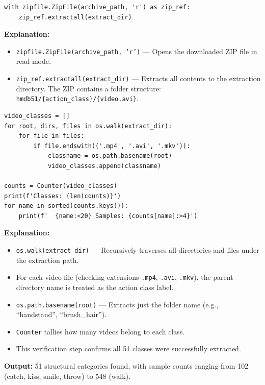 \documentclass[a4paper, 12pt]{article}
\newenvironment{explanation}{%
  \par\smallskip
  \noindent\textcolor{blue!70!black}{\textbf{Explanation:}}\\
  \noindent
}{\par\medskip}
\begin{document}
\begin{lstlisting}
with zipfile.ZipFile(archive_path, 'r') as zip_ref:
    zip_ref.extractall(extract_dir)
\end{lstlisting}

\begin{explanation}
\begin{itemize}[nosep]
  \item \texttt{zipfile.ZipFile(archive\_path, 'r')} --- Opens the downloaded ZIP file in read mode.
  \item \texttt{zip\_ref.extractall(extract\_dir)} --- Extracts all contents to the extraction directory. The ZIP contains a folder structure: \texttt{hmdb51/\{action\_class\}/\{video.avi\}}.
\end{itemize}
\end{explanation}

\begin{lstlisting}
video_classes = []
for root, dirs, files in os.walk(extract_dir):
    for file in files:
        if file.endswith(('.mp4', '.avi', '.mkv')):
            classname = os.path.basename(root)
            video_classes.append(classname)

counts = Counter(video_classes)
print(f'Classes: {len(counts)}')
for name in sorted(counts.keys()):
    print(f'  {name:<20} Samples: {counts[name]:>4}')
\end{lstlisting}

\begin{explanation}
\begin{itemize}[nosep]
  \item \texttt{os.walk(extract\_dir)} --- Recursively traverses all directories and files under the extraction path.
  \item For each video file (checking extensions \texttt{.mp4}, \texttt{.avi}, \texttt{.mkv}), the parent directory name is treated as the action class label.
  \item \texttt{os.path.basename(root)} --- Extracts just the folder name (e.g., ``handstand'', ``brush\_hair'').
  \item \texttt{Counter} tallies how many videos belong to each class.
  \item This verification step confirms all 51 classes were successfully extracted.
\end{itemize}
\textbf{Output:} 51 structural categories found, with sample counts ranging from 102 (catch, kiss, smile, throw) to 548 (walk).
\end{explanation}
\end{document}
